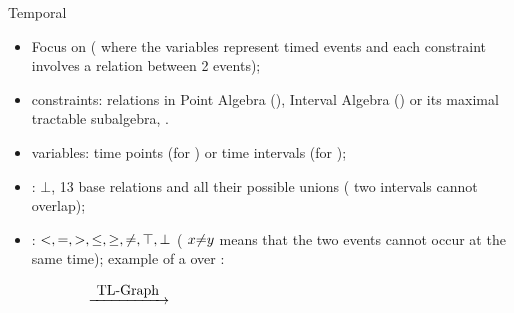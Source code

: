 \begin{frame}{Temporal \CSPNames{}}
    \begin{itemize}
        \item Focus on \TCSPNames{} (\ie{} \CSPNames{} where the variables represent timed events and each constraint involves a relation between 2 events);
        \item constraints: relations in Point Algebra (\PAName{}), Interval Algebra (\IAName{}) or its maximal tractable subalgebra,  \OrdHornName{}.
        \item variables: time points (for \PAName{}) or time intervals (for \IAName{});
        \item \IAName{}: $\bot$, 13 base relations and all their possible unions (\eg{} two intervals cannot overlap);
        \item \PAName{}: $<, =, >, \leq, \geq, \noteq{}, \top, \bot$ (\eg{} $x \noteq{} y$ means that the two events cannot occur at the same time); example of a \TCSPName{} over \PAName{}:
	\end{itemize}

    \begin{figure}
        \centering
        \begin{subfigure}{0.44\textwidth}
            \centering
        \end{subfigure}\hfill%
        \begin{subfigure}{0.1\textwidth}
            \centering
            $\xrightarrow{\mbox{ TL-Graph {}}}$
        \end{subfigure}\hfill%
        \begin{subfigure}{0.44\textwidth}
            \centering
\end{subfigure}
\end{figure}
\end{frame}

